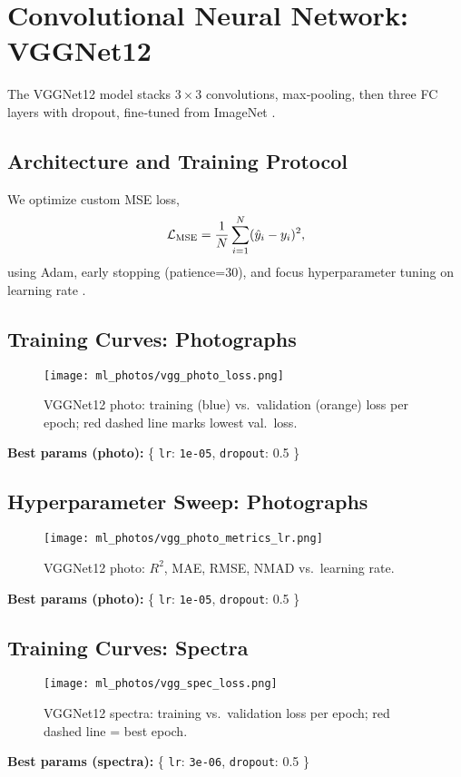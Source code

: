 \documentclass[english,bachelor,oneside]{ctufit-thesis}
\begin{document}
\section{Convolutional Neural Network: VGGNet12}
The VGGNet12 model stacks $3\times3$ convolutions, max‐pooling, then three FC layers with dropout, fine‐tuned from ImageNet \cite{SimonyanZisserman2014}.

\subsection{Architecture and Training Protocol}
We optimize custom MSE loss,
\[
  \mathcal{L}_{\rm MSE} = \frac1N\sum_{i=1}^N (\hat y_i - y_i)^2,
\]
using Adam, early stopping (patience=30), and focus hyperparameter tuning on learning rate \cite{Goodfellow2016,Prechelt1998,Smith2017}.

\subsection{Training Curves: Photographs}
\begin{figure}[H]
  \centering
  \texttt{[image: ml\_photos/vgg\_photo\_loss.png]}
  \caption{VGGNet12 photo: training (blue) vs.\ validation (orange) loss per epoch; red dashed line marks lowest val.\ loss.}
  \label{fig:vgg_photo_loss}
\end{figure}
\noindent\textbf{Best params (photo):} \{ \texttt{lr}: \verb|1e-05|, \texttt{dropout}: 0.5 \}\\

\subsection{Hyperparameter Sweep: Photographs}
\begin{figure}[H]
  \centering
  \texttt{[image: ml\_photos/vgg\_photo\_metrics\_lr.png]}
  \caption{VGGNet12 photo: $R^2$, MAE, RMSE, NMAD vs.\ learning rate.}
  \label{fig:vgg_photo_metrics}
\end{figure}
\noindent\textbf{Best params (photo):} \{ \texttt{lr}: \verb|1e-05|, \texttt{dropout}: 0.5 \}\\

\subsection{Training Curves: Spectra}
\begin{figure}[H]
  \centering
  \texttt{[image: ml\_photos/vgg\_spec\_loss.png]}
  \caption{VGGNet12 spectra: training vs.\ validation loss per epoch; red dashed line = best epoch.}
  \label{fig:vgg_spec_loss}
\end{figure}
\noindent\textbf{Best params (spectra):} \{ \texttt{lr}: \verb|3e-06|, \texttt{dropout}: 0.5 \}\\
\end{document}
